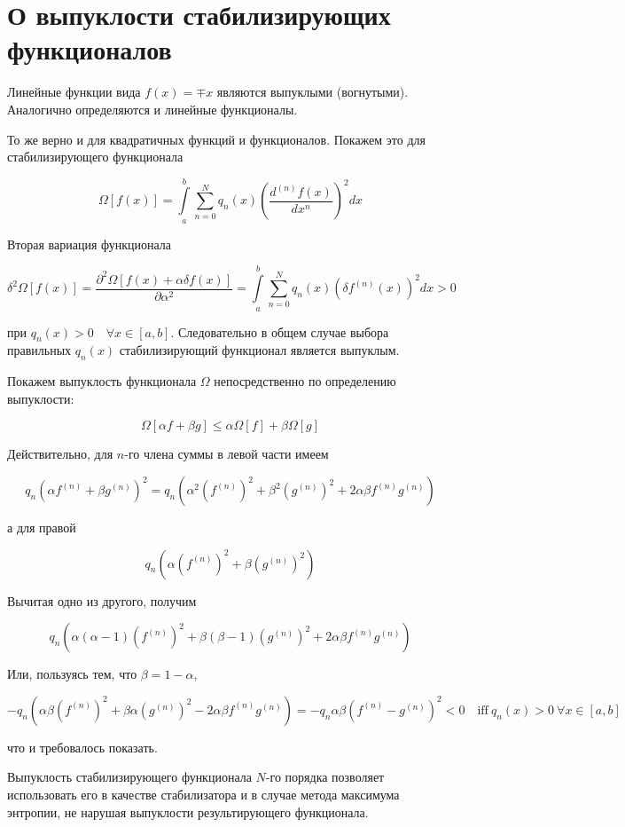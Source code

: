 \section{О выпуклости стабилизирующих функционалов}

Линейные функции вида $f(x) = \mp x$ являются выпуклыми (вогнутыми). Аналогично определяются и линейные функционалы.

То же верно и для квадратичных функций и функционалов. Покажем это для стабилизирующего функционала

$$\Omega[f(x)] = \int\limits_a^b \sum\limits_{n=0}^N q_n(x) \left(\frac{d^{(n)}f(x)}{dx^n}\right)^2 dx$$

Вторая вариация функционала

$${\delta}^2\Omega[f(x)] =
\frac{{\partial}^2 \Omega[f(x) + \alpha\delta f(x)]}{\partial{\alpha}^2} =
\int\limits_a^b \sum\limits_{n=0}^N q_n(x) {\left(\delta f^{(n)}(x)\right)}^2 dx > 0$$

при $q_n(x) > 0 \quad \forall x \in [a, b]$. Следовательно в общем случае выбора правильных $q_n(x)$ стабилизирующий функционал является выпуклым.

Покажем выпуклость функционала $\Omega$ непосредственно по определению выпуклости:

$$\Omega[\alpha f + \beta g] \leq \alpha \Omega[f] + \beta \Omega[g]$$

Действительно, для $n$-го члена суммы в левой части имеем

$$q_n (\alpha f^{(n)} + \beta g^{(n)})^2 = q_n (\alpha^2 (f^{(n)})^2 + \beta^2 (g^{(n)})^2 + 2 \alpha \beta f^{(n)} g^{(n)})$$

а для правой

$$q_n ( \alpha (f^{(n)})^2 + \beta (g^{(n)})^2 )$$

Вычитая одно из другого, получим

$$q_n (\alpha (\alpha - 1) (f^{(n)})^2 + \beta (\beta -1) (g^{(n)})^2 + 2\alpha \beta f^{(n)} g^{(n)})$$

Или, пользуясь тем, что $\beta = 1 - \alpha$,

$$- q_n (\alpha \beta (f^{(n)})^2 + \beta \alpha (g^{(n)})^2 - 2\alpha \beta f^{(n)} g^{(n)}) = - q_n \alpha \beta (f^{(n)} - g^{(n)})^2 < 0 \quad \textrm{iff}\ q_n(x) > 0 \ \forall x \in [a, b]$$

что и требовалось показать.

Выпуклость стабилизирующего функционала $N$-го порядка позволяет использовать его в качестве стабилизатора и в случае метода максимума энтропии, не нарушая выпуклости результирующего функционала.